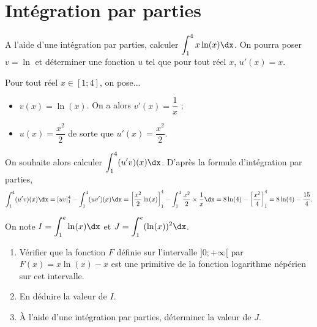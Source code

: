 \documentclass[11pt,fleqn, openany]{book} %
\begin{document}

\section*{Intégration par parties}


\begin{exercise}[topic=int03]
A l'aide d'une intégration par parties, calculer $\displaystyle\int_{1}^4 x\ln(x)\dx$. On pourra poser $v=\ln$ et déterminer une fonction $u$ tel que pour tout réel $x$, $u'(x)=x$.\end{exercise}

\begin{solution}
Pour tout réel \(x\in[1;4]\), on pose...
\begin{itemize}
\item  \(v(x)=\ln(x)\). On a alors \(v'(x)=\dfrac{1}{x}\) ;
\item  \(u(x)=\dfrac{x^2}{2}\) de sorte que \(u'(x)=\dfrac{x^2}{2}\).
\end{itemize}

On souhaite alors calculer \(\displaystyle\int_{1}^4 (u'v)(x)\dx\). D'après la formule d'intégration par parties,
\[ \displaystyle\int_{1}^4 (u'v)(x)\dx = [uv]_1^4 - \displaystyle\int_{1}^4 (uv')(x)\dx=\left[\dfrac{x^2}{2}\ln(x)\right]_1^4-\displaystyle\int_{1}^4 \dfrac{x^2}{2} \times \dfrac{1}{x}\dx=8\ln(4)- \left[ \dfrac{x^2}{4}\right]_1^4 = 8\ln(4)-\dfrac{15}{4}.\]\end{solution}



\begin{exercise}[topic=int03, subtitle={(Un extrait d'exercice que j'ai eu au bac...)}]
On note $I=\displaystyle\int_1^e \ln(x) \dx$ et $J=\displaystyle\int_1^e (\ln(x))^2\dx$.
\begin{enumerate}
\item Vérifier que la fonction $F$ définie sur l'intervalle $]0;+\infty[$ par $F(x)=x\ln(x)-x$ est une primitive de la fonction logarithme népérien sur cet intervalle.
\item En déduire la valeur de $I$.
\item À l'aide d'une intégration par parties, déterminer la valeur de $J$.
\end{enumerate}
\end{exercise}
\end{document}
